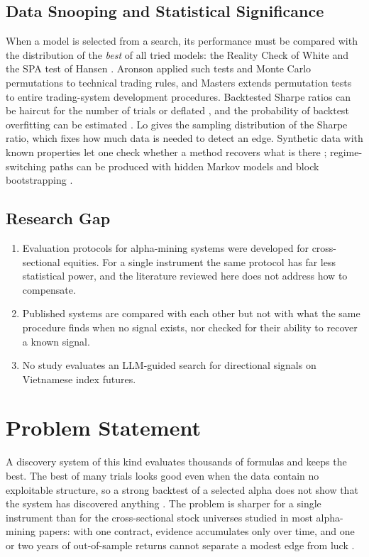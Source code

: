 \documentclass[12pt,a4paper,oneside]{book}
\theoremstyle{definition}
\begin{document}
\subsection{Data Snooping and Statistical Significance}

When a model is selected from a search, its performance must be compared with the distribution of the \emph{best} of all tried models: the Reality Check of White \cite{white2000} and the SPA test of Hansen \cite{hansen2005}. Aronson \cite{aronson2006} applied such tests and Monte Carlo permutations to technical trading rules, and Masters \cite{masters2020} extends permutation tests to entire trading-system development procedures. Backtested Sharpe ratios can be haircut for the number of trials \cite{harvey2015,harvey2016} or deflated \cite{bailey2014}, and the probability of backtest overfitting can be estimated \cite{bailey2017}. Lo \cite{lo2002} gives the sampling distribution of the Sharpe ratio, which fixes how much data is needed to detect an edge. Synthetic data with known properties let one check whether a method recovers what is there \cite{lopezdeprado2018,arian2024}; regime-switching paths can be produced with hidden Markov models and block bootstrapping \cite{hamilton1989,rabiner1989,kunsch1989}.

\subsection{Research Gap}

\begin{enumerate}
  \item Evaluation protocols for alpha-mining systems were developed for cross-sectional equities. For a single instrument the same protocol has far less statistical power, and the literature reviewed here does not address how to compensate.
  \item Published systems are compared with each other but not with what the same procedure finds when no signal exists, nor checked for their ability to recover a known signal.
  \item No study evaluates an LLM-guided search for directional signals on Vietnamese index futures.
\end{enumerate}

\section{Problem Statement}

A discovery system of this kind evaluates thousands of formulas and keeps the best. The best of many trials looks good even when the data contain no exploitable structure, so a strong backtest of a selected alpha does not show that the system has discovered anything \cite{white2000,harvey2016,harvey2015}. The problem is sharper for a single instrument than for the cross-sectional stock universes studied in most alpha-mining papers: with one contract, evidence accumulates only over time, and one or two years of out-of-sample returns cannot separate a modest edge from luck \cite{lo2002}.
\end{document}
